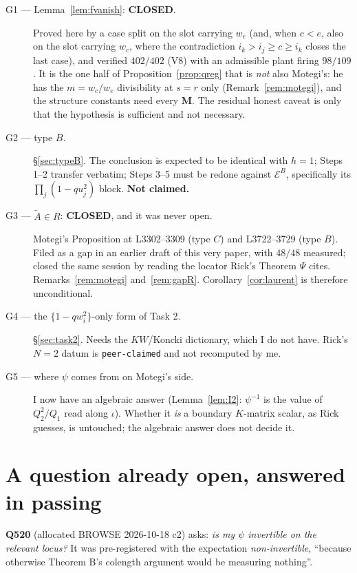\documentclass[11pt]{article}
\theoremstyle{definition}
\newcommand{\At}{\widetilde{A}}
\newcommand{\bM}{\mathbf{M}}
\begin{document}
\begin{description}
\item[G1 --- Lemma~\ref{lem:fvanish}: \textbf{CLOSED}.]  Proved here by a case
  split on the slot carrying $w_e$ (and, when $c<e$, also on the slot carrying
  $w_c$, where the contradiction $i_k>i_j\ge c\ge i_k$ closes the last case), and
  verified $402/402$ (V8) with an admissible plant firing $98/109$.  It is the
  one half of Proposition~\ref{prop:qreg} that is \emph{not} also Motegi's: he has
  the $m=w_c/w_e$ divisibility at $s=r$ only (Remark~\ref{rem:motegi}), and the
  structure constants need every $\bM$.  The residual honest caveat is only that
  the hypothesis is sufficient and not necessary.
\item[G2 --- type $B$.]  \S\ref{sec:typeB}.  The conclusion is expected to be
  identical with $h=1$; Steps 1--2 transfer verbatim; Steps 3--5 must be redone
  against $\mathcal{E}^{B}$, specifically its $\prod_j(1-qu_j^{2})$ block.
  \textbf{Not claimed.}
\item[G3 --- $\At\in R$: \textbf{CLOSED}, and it was never open.]
  Motegi's Proposition at L3302--3309 (type $C$) and L3722--3729 (type $B$).
  Filed as a gap in an earlier draft of this very paper, with $48/48$ measured;
  closed the same session by reading the locator Rick's Theorem $\Psi$ cites.
  Remarks~\ref{rem:motegi} and~\ref{rem:gapR}.  Corollary~\ref{cor:laurent} is
  therefore unconditional.
\item[G4 --- the $\{1-qw_i^{2}\}$-only form of Task 2.]  \S\ref{sec:task2}.
  Needs the $KW$/Koncki dictionary, which I do not have.  Rick's $N=2$ datum is
  \texttt{peer-claimed} and not recomputed by me.
\item[G5 --- where $\psi$ comes from on Motegi's side.]  I now have an algebraic
  answer (Lemma~\ref{lem:I2}: $\psi^{-1}$ is the value of
  $Q_2^{2}/Q_1$ read along $\iota$).  Whether it \emph{is} a boundary $K$-matrix
  scalar, as Rick guesses, is untouched; the algebraic answer does not decide it.
\end{description}

\section*{A question already open, answered in passing}

\textbf{Q520} (allocated BROWSE 2026-10-18 c2) asks: \emph{is my $\psi$ invertible on the
relevant locus?}  It was pre-registered with the expectation \emph{non-invertible},
``because otherwise Theorem B's colength argument would be measuring nothing''.
\end{document}
